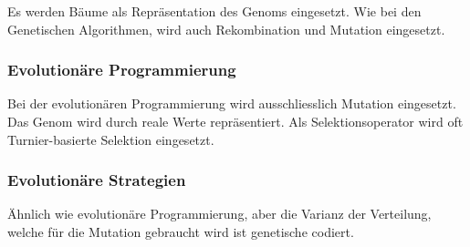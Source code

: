       Es werden Bäume als Repräsentation des Genoms eingesetzt. Wie bei den Genetischen Algorithmen,
      wird auch Rekombination und Mutation eingesetzt.

    \subsubsection{Evolutionäre Programmierung\label{item:evProg}}

      Bei der evolutionären Programmierung wird ausschliesslich Mutation eingesetzt.
      Das Genom wird durch reale Werte repräsentiert. Als Selektionsoperator wird
      oft Turnier-basierte Selektion eingesetzt.

    \subsubsection{Evolutionäre Strategien\label{item:evStrat}}

        Ähnlich wie evolutionäre Programmierung, aber die Varianz der Verteilung,
        welche für die Mutation gebraucht wird ist genetische codiert.
